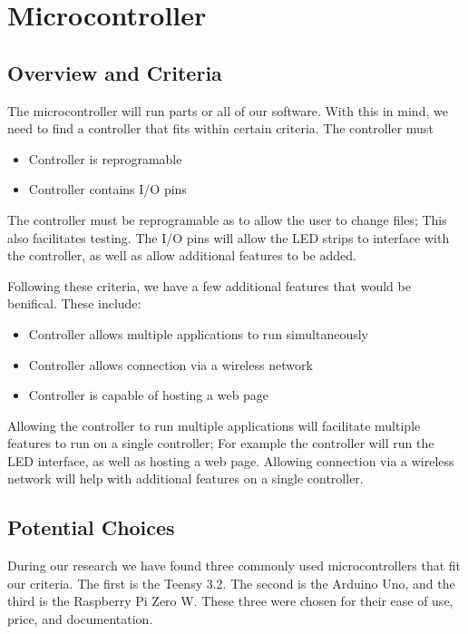\documentclass[onecolumn, draftclsnofoot,10pt, compsoc]{IEEEtran}
\begin{document}
\newpage

\tableofcontents
\clearpage
\singlespace


	\section{Microcontroller}
		\subsection{Overview and Criteria}
		The microcontroller will run parts or all of our software. With this in mind,
		we need to find a controller that fits within certain criteria. The
		controller must
		\begin{itemize}
			\item Controller is reprogramable
			\item Controller contains I/O pins
		\end{itemize}
		The controller must be reprogramable as to allow the user to change files;
		This also facilitates testing. The I/O pins will allow the LED strips to
		interface with the controller, as well as allow additional features to be
		added.

		\vspace{5mm}
		\noindent Following these criteria, we have a few additional features that would be
		benifical. These include:
		\begin{itemize}
			\item Controller allows multiple applications to run simultaneously
			\item Controller allows connection via a wireless network
			\item Controller is capable of hosting a web page
		\end{itemize}
		Allowing the controller to run multiple applications will facilitate
		multiple features to run on a single controller; For example the controller
		will run the LED interface, as well as hosting a web page. Allowing
		connection via a wireless network will help with additional features on a
		single controller.
		\subsection{Potential Choices}
		During our research we have found three commonly used microcontrollers that
		fit our criteria. The first is the Teensy 3.2. The second is the Arduino Uno,
		and the third is the Raspberry Pi Zero W. These three were chosen for their
		ease of use, price, and documentation.
\end{document}
